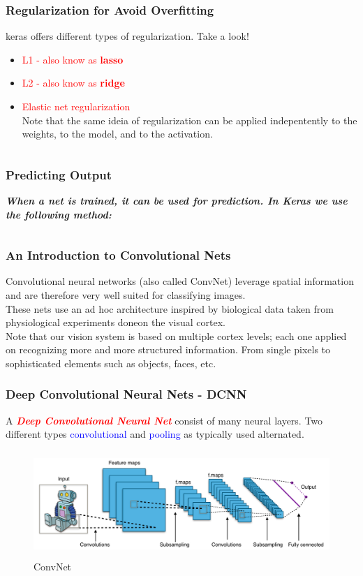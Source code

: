 \documentclass[aspectratio=169]{beamer}
\begin{document}
\begin{frame}
\frametitle{Regularization for Avoid Overfitting}
keras offers different types of regularization. Take a look! 
\\[0.3cm]
\begin{itemize}
\item \textcolor{red}{L1 - also know as \textbf{lasso}}
\item \textcolor{red}{L2 - also know as \textbf{ridge}}
\item \textcolor{red}{Elastic net regularization}
\\[0.3cm]
Note that the same ideia of regularization can be applied indepentently to the weights, to the model, and to the activation.
\inputminted{python}{./aux_files/twentythree.py} 
\end{itemize}
\end{frame}

\begin{frame}
\frametitle{Predicting Output}
\textbf{\emph{When a net is trained, it can be used for prediction. In Keras we use the following method:}}
\inputminted{python}{./aux_files/twentyfour.py}
\end{frame}

\begin{frame}
\frametitle{An Introduction to Convolutional Nets}
Convolutional neural networks (also called ConvNet) leverage spatial information and are therefore very well suited for classifying images.
\\[0.3cm]
These nets use an ad hoc architecture inspired by biological data taken from physiological experiments doneon the visual cortex. 
\\[0.3cm]
Note that our vision system is based on multiple cortex levels; each one applied on recognizing more and more structured information. From single pixels to sophisticated elements such as objects, faces, etc. 
\end{frame}

\begin{frame}
\frametitle{Deep Convolutional Neural Nets - DCNN}
A \textbf{\emph{\textcolor{red}{Deep Convolutional Neural Net}}} consist of many neural layers. Two different types \textcolor{blue}{convolutional} and \textcolor{blue}{pooling} as typically used alternated.
\begin{figure}
\includegraphics[width=15cm,height=4cm]{./aux_files/two.jpg}
\caption{ConvNet}
\label{fig:ConvNet Digits}
\end{figure}
\end{frame}
\end{document}
